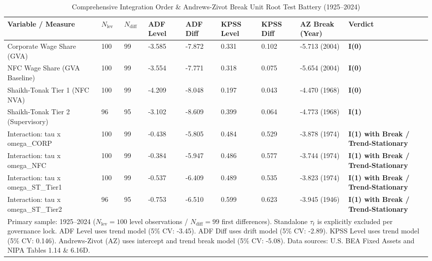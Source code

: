 \begin{table}[h!]
\centering
\small
\caption{Comprehensive Integration Order \& Andrews-Zivot Break Unit Root Test Battery (1925--2024)}
\label{tab:urca_battery_results}
\begin{tabular}{p{3.8cm} p{0.8cm} p{0.8cm} p{1.3cm} p{1.3cm} p{1.3cm} p{1.3cm} p{1.8cm} p{1.5cm}}
\toprule
\textbf{Variable / Measure} & \textbf{$N_{\text{lev}}$} & \textbf{$N_{\text{diff}}$} & \textbf{ADF Level} & \textbf{ADF Diff} & \textbf{KPSS Level} & \textbf{KPSS Diff} & \textbf{AZ Break (Year)} & \textbf{Verdict} \\
\midrule
Corporate Wage Share (GVA) & 100 & 99 & -3.585 & -7.872 & 0.331 & 0.102 & -5.713 (2004) & \textbf{I(0)} \\
NFC Wage Share (GVA Baseline) & 100 & 99 & -3.554 & -7.771 & 0.318 & 0.075 & -5.654 (2004) & \textbf{I(0)} \\
Shaikh-Tonak Tier 1 (NFC NVA) & 100 & 99 & -4.209 & -8.048 & 0.197 & 0.043 & -4.470 (1968) & \textbf{I(0)} \\
Shaikh-Tonak Tier 2 (Supervisory) & 96 & 95 & -3.102 & -8.609 & 0.399 & 0.064 & -4.773 (1968) & \textbf{I(1)} \\
Interaction: tau x omega_CORP & 100 & 99 & -0.438 & -5.805 & 0.484 & 0.529 & -3.878 (1974) & \textbf{I(1) with Break / Trend-Stationary} \\
Interaction: tau x omega_NFC & 100 & 99 & -0.384 & -5.947 & 0.486 & 0.577 & -3.744 (1974) & \textbf{I(1) with Break / Trend-Stationary} \\
Interaction: tau x omega_ST_Tier1 & 100 & 99 & -0.537 & -6.409 & 0.489 & 0.535 & -3.823 (1974) & \textbf{I(1) with Break / Trend-Stationary} \\
Interaction: tau x omega_ST_Tier2 & 96 & 95 & -0.753 & -6.510 & 0.599 & 0.623 & -3.945 (1946) & \textbf{I(1) with Break / Trend-Stationary} \\
\bottomrule
\multicolumn{9}{p{16.0cm}}{\footnotesize Primary sample: 1925--2024 ($N_{\text{lev}}=100$ level observations / $N_{\text{diff}}=99$ first differences). Standalone $\tau_t$ is explicitly excluded per governance lock. ADF Level uses trend model (5\% CV: -3.45). ADF Diff uses drift model (5\% CV: -2.89). KPSS Level uses trend model (5\% CV: 0.146). Andrews-Zivot (AZ) uses intercept and trend break model (5\% CV: -5.08). Data sources: U.S. BEA Fixed Assets and NIPA Tables 1.14 \& 6.16D.}
\end{tabular}
\end{table}
